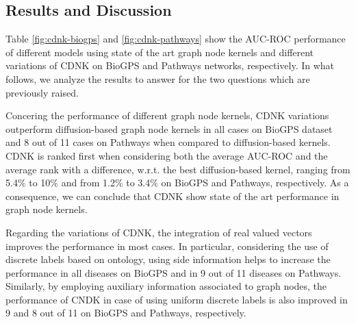 \documentclass[review]{elsarticle}
\begin{document}
\subsection{Results and Discussion}
Table \ref{fig:cdnk-biogps} and \ref{fig:cdnk-pathways} show the AUC-ROC performance of different models using state of the art graph node kernels and different variations of CDNK on BioGPS and Pathways networks, respectively. In what follows, we analyze the results to answer for the two questions which are previously raised.

Concering the performance of different graph node kernels, CDNK variations outperform diffusion-based graph node kernels in all cases on BioGPS dataset and 8 out of 11 cases on Pathways when compared to diffusion-based kernels. CDNK is ranked first when considering both the average AUC-ROC and the average rank with a difference, w.r.t. the best diffusion-based kernel, ranging from 5.4$\%$ to 10$\%$ and from 1.2$\%$ to 3.4$\%$ on BioGPS and Pathways, respectively. As a consequence, we can conclude that CDNK show state of the art performance in graph node kernels.

Regarding the variations of CDNK, the integration of real valued vectors improves the performance in most cases. In particular, considering the use of discrete labels based on ontology, using side information helps to increase the performance in all diseases on BioGPS and in 9 out of 11 diseases on Pathways. Similarly, by employing auxiliary information associated to graph nodes, the performance of CNDK in case of using uniform discrete labels is also improved in 9 and 8 out of 11 on BioGPS and Pathways, respectively.
\end{document}
